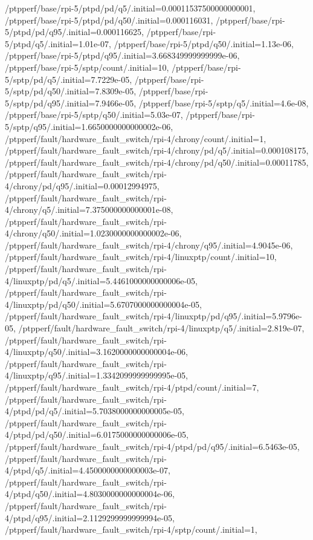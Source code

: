 {    /ptpperf/base/rpi-5/ptpd/pd/q5/.initial=0.00011537500000000001,
    /ptpperf/base/rpi-5/ptpd/pd/q50/.initial=0.000116031,
    /ptpperf/base/rpi-5/ptpd/pd/q95/.initial=0.000116625,
    /ptpperf/base/rpi-5/ptpd/q5/.initial=1.01e-07,
    /ptpperf/base/rpi-5/ptpd/q50/.initial=1.13e-06,
    /ptpperf/base/rpi-5/ptpd/q95/.initial=3.668349999999999e-06,
    /ptpperf/base/rpi-5/sptp/count/.initial=10,
    /ptpperf/base/rpi-5/sptp/pd/q5/.initial=7.7229e-05,
    /ptpperf/base/rpi-5/sptp/pd/q50/.initial=7.8309e-05,
    /ptpperf/base/rpi-5/sptp/pd/q95/.initial=7.9466e-05,
    /ptpperf/base/rpi-5/sptp/q5/.initial=4.6e-08,
    /ptpperf/base/rpi-5/sptp/q50/.initial=5.03e-07,
    /ptpperf/base/rpi-5/sptp/q95/.initial=1.6650000000000002e-06,
    /ptpperf/fault/hardware_fault_switch/rpi-4/chrony/count/.initial=1,
    /ptpperf/fault/hardware_fault_switch/rpi-4/chrony/pd/q5/.initial=0.000108175,
    /ptpperf/fault/hardware_fault_switch/rpi-4/chrony/pd/q50/.initial=0.00011785,
    /ptpperf/fault/hardware_fault_switch/rpi-4/chrony/pd/q95/.initial=0.00012994975,
    /ptpperf/fault/hardware_fault_switch/rpi-4/chrony/q5/.initial=7.375000000000001e-08,
    /ptpperf/fault/hardware_fault_switch/rpi-4/chrony/q50/.initial=1.0230000000000002e-06,
    /ptpperf/fault/hardware_fault_switch/rpi-4/chrony/q95/.initial=4.9045e-06,
    /ptpperf/fault/hardware_fault_switch/rpi-4/linuxptp/count/.initial=10,
    /ptpperf/fault/hardware_fault_switch/rpi-4/linuxptp/pd/q5/.initial=5.4461000000000006e-05,
    /ptpperf/fault/hardware_fault_switch/rpi-4/linuxptp/pd/q50/.initial=5.6707000000000004e-05,
    /ptpperf/fault/hardware_fault_switch/rpi-4/linuxptp/pd/q95/.initial=5.9796e-05,
    /ptpperf/fault/hardware_fault_switch/rpi-4/linuxptp/q5/.initial=2.819e-07,
    /ptpperf/fault/hardware_fault_switch/rpi-4/linuxptp/q50/.initial=3.1620000000000004e-06,
    /ptpperf/fault/hardware_fault_switch/rpi-4/linuxptp/q95/.initial=1.3342099999999995e-05,
    /ptpperf/fault/hardware_fault_switch/rpi-4/ptpd/count/.initial=7,
    /ptpperf/fault/hardware_fault_switch/rpi-4/ptpd/pd/q5/.initial=5.7038000000000005e-05,
    /ptpperf/fault/hardware_fault_switch/rpi-4/ptpd/pd/q50/.initial=6.0175000000000006e-05,
    /ptpperf/fault/hardware_fault_switch/rpi-4/ptpd/pd/q95/.initial=6.5463e-05,
    /ptpperf/fault/hardware_fault_switch/rpi-4/ptpd/q5/.initial=4.4500000000000003e-07,
    /ptpperf/fault/hardware_fault_switch/rpi-4/ptpd/q50/.initial=4.8030000000000004e-06,
    /ptpperf/fault/hardware_fault_switch/rpi-4/ptpd/q95/.initial=2.1129299999999994e-05,
    /ptpperf/fault/hardware_fault_switch/rpi-4/sptp/count/.initial=1,
}
